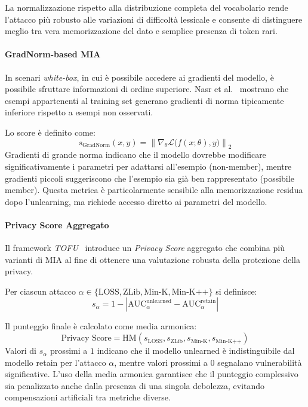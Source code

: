 La normalizzazione rispetto alla distribuzione completa del vocabolario rende l’attacco più robusto alle variazioni di difficoltà lessicale e consente di distinguere meglio tra vera memorizzazione del dato e semplice presenza di token rari.


\paragraph{GradNorm-based MIA}
In scenari \emph{white-box}, in cui è possibile accedere ai gradienti del modello, è possibile sfruttare informazioni di ordine superiore.  
Nasr et al.~\cite{Nasr_2019} mostrano che esempi appartenenti al training set generano gradienti di norma tipicamente inferiore rispetto a esempi non osservati.

Lo score è definito come:
\[
s_{\text{GradNorm}}(x, y) =
\left\| \nabla_\theta \mathcal{L}\bigl(f(x; \theta), y\bigr) \right\|_2
\]
Gradienti di grande norma indicano che il modello dovrebbe modificare significativamente i parametri per adattarsi all’esempio (non-member), mentre gradienti piccoli suggeriscono che l’esempio sia già ben rappresentato (possibile member). Questa metrica è particolarmente sensibile alla memorizzazione residua dopo l’unlearning, ma richiede accesso diretto ai parametri del modello.

\paragraph{Privacy Score Aggregato}
Il framework \textit{TOFU}~\cite{maini2024tofu} introduce un \emph{Privacy Score} aggregato che combina più varianti di MIA al fine di ottenere una valutazione robusta della protezione della privacy.

Per ciascun attacco $\alpha \in \{\text{LOSS}, \text{ZLib}, \text{Min-K}, \text{Min-K++}\}$ si definisce:
\[
s_\alpha = 1 - \left| \text{AUC}_\alpha^{\text{unlearned}} -
\text{AUC}_\alpha^{\text{retain}} \right|
\]

Il punteggio finale è calcolato come media armonica:
\[
\text{Privacy Score} =
\text{HM}(s_{\text{LOSS}}, s_{\text{ZLib}},
s_{\text{Min-K}}, s_{\text{Min-K++}})
\]
Valori di $s_\alpha$ prossimi a $1$ indicano che il modello unlearned è indistinguibile dal modello retain per l’attacco $\alpha$, mentre valori prossimi a $0$ segnalano vulnerabilità significative. L’uso della media armonica garantisce che il punteggio complessivo sia penalizzato anche dalla presenza di una singola debolezza, evitando compensazioni artificiali tra metriche diverse.


